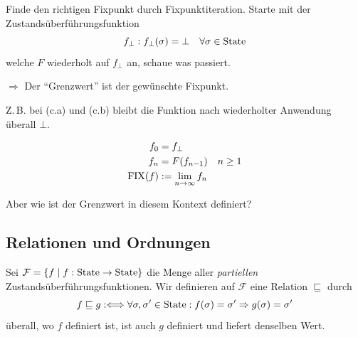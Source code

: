 \begin{remark}[Idee]
    Finde den richtigen Fixpunkt durch Fixpunktiteration. Starte mit der Zustandsüberführungsfunktion \[
    f_{\bot} : f_{\bot}(\sigma) = \bot \quad \forall \sigma \in \operatorname{State}
    \]
    welche $F$ wiederholt auf $f_{\bot}$ an, schaue was passiert.

    $\Rightarrow$ Der ``Grenzwert'' ist der gewünschte Fixpunkt.

    Z.\,B. bei (c.a) und (c.b) bleibt die Funktion nach wiederholter Anwendung überall $\bot$.
\end{remark}

\begin{definition}[Fixpunktoperator]
    \begin{align*}
        f_0 & = f_{\bot} \\
        f_n &= F(f_{n-1}) \quad n \geq 1 \\
        \operatorname{FIX}(f) & := \lim_{n \to \infty} f_n
    \end{align*}

    Aber wie ist der Grenzwert in diesem Kontext definiert?
\end{definition}



\subsection{Relationen und Ordnungen}

\begin{definition}
    Sei $\mathcal{F} = \{ f \;\vert\; f: \operatorname{State} \to \operatorname{State} \}$ die Menge aller \emph{partiellen} Zustandsüberführungsfunktionen. Wir definieren auf $\mathcal{F}$ eine Relation $\sqsubseteq$ durch \[
        f \sqsubseteq g :\Longleftrightarrow \forall \sigma, \sigma' \in \operatorname{State}: f(\sigma) = \sigma' \Rightarrow g(\sigma) = \sigma'
        \]
        \dh{} überall, wo $f$ definiert ist, ist auch $g$ definiert und liefert denselben Wert.
\end{definition}

